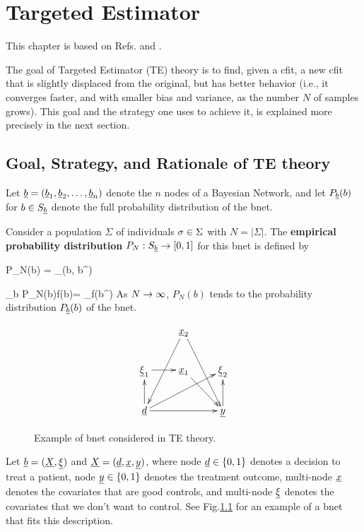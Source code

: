 \chapter{Targeted Estimator}
\label{ch-targeted-est}

\newcommand{\dpsi}[0]{\nabla\Psi}
\newcommand{\hatl}[0]{\HAT{\call}}

This chapter is based on Refs.\cite{tlride} and  \cite{hoff}.

The goal of Targeted Estimator (TE) theory is
to find, given a cfit,
a new cfit that is slightly
displaced from the original,
but has better behavior (i.e.,
it converges faster, and with smaller
bias and variance, as the number $N$
of samples grows). This goal and
the strategy one uses to achieve it, is
explained more precisely in the next section.




\section{Goal, Strategy, and Rationale of TE theory}


Let ${\underline{b}} = ({\underline{b}}_1, {\underline{b}}_2, \ldots, {\underline{b}}_{n})$ denote
the $n$ nodes of a Bayesian Network, and let $P_{\underline{b}}(b)$ for $b\in S_{\underline{b}}$
denote the full probability distribution of the bnet.

 Consider a population $\Sigma$ of
 individuals $\sigma\in \Sigma$ with $N=|\Sigma|$.
 The {\bf empirical probability distribution}
 $P_N:S_{\underline{b}} \rightarrow [0,1]$ for this bnet is defined by

\beq
P_N(b) = \sum_\s\delta(b, b^\s)
\eeq

\beq
\sum_b P_N(b)f(b)=
\sum_\s f(b^\s)
\eeq
As $N\rightarrow \infty$, $P_N(b)$ tends
to the probability distribution $P_{\underline{b}}(b)$
of the bnet.
\begin{figure}[h!]
$$
\xymatrix{
&\rvx_2\ar[ddl]\ar[ddr]
\\
\ul{\xi}_1\ar[r]
&\rvx_1\ar[dr]
&\ul{\xi}_2
\\
\rvd\ar[rr]\ar[u]\ar[rru]
&
&\rvy\ar[u]
}
$$
\caption{Example of bnet considered in TE
theory.}
\label{fig-targeted-bnet}
\end{figure}

Let ${\underline{b}}=({\underline{X}}, \underline{\xi})$ and
${\underline{X}}=({\underline{d}}, {\underline{x}},{\underline{y}})$,
where
node ${\underline{d}}\in\{0,1\}$ denotes a decision to treat a patient,
node ${\underline{y}}\in \{0,1\}$ denotes the treatment outcome,
multi-node ${\underline{x}}$ denotes the covariates
that are good controls, and multi-node $\underline{\xi}$ denotes
the covariates that we don't want to control.
See Fig.\ref{fig-targeted-bnet}
for an example of a bnet that fits this description.


